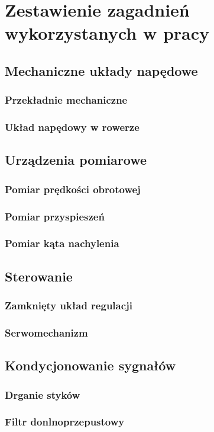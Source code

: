\chapter{Zestawienie zagadnień wykorzystanych w pracy}
\label{cha:Zestawienie zagadnień wykorzystanych w pracy}

\section{Mechaniczne układy napędowe}
\subsection{Przekładnie mechaniczne}
\subsection{Układ napędowy w rowerze}

\section{Urządzenia pomiarowe}
\subsection{Pomiar prędkości obrotowej}
\subsection{Pomiar przyspieszeń}
\subsection{Pomiar kąta nachylenia}

\section{Sterowanie}


\subsection{Zamknięty układ regulacji}
\subsection{Serwomechanizm}

\section{Kondycjonowanie sygnałów}


\subsection{Drganie styków}
\subsection{Filtr donlnoprzepustowy}